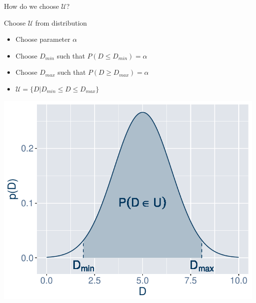 \documentclass[slides]{beamer}
\begin{document}
\begin{frame}{How do we choose $\mathcal{U}$?}
    \vspace{-10pt}
    \begin{block}{Choose $\mathcal{U}$ from distribution}
        \begin{minipage}[t]{.47\textwidth}
            \begin{itemize}
                \item Choose parameter $\alpha$
                \item Choose $D_{min}$ such that $P(D \leq D_{min}) = \alpha$
                \item Choose $D_{max}$ such that $P(D \geq D_{max}) = \alpha$
                \item $\mathcal{U} = \{D|D_{min} \leq D \leq D_{max}\}$
            \end{itemize}
        \end{minipage}
        \hfill\hfill
        \begin{minipage}[t]{.47\textwidth}
            \begin{center}
                \includegraphics[scale=0.45]{uncertainty-set.pdf} \\
            \end{center}
        \end{minipage}
    \end{block}
\end{frame}
\end{document}
